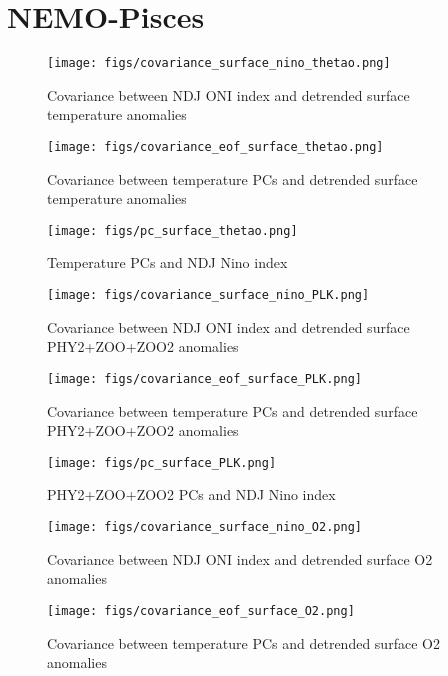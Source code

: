 
\section{NEMO-Pisces}

\newpage

\begin{figure}[h!]
\centering
    \texttt{[image: figs/covariance\_surface\_nino\_thetao.png]}
    \caption{Covariance between NDJ ONI index and detrended surface temperature anomalies}
\end{figure}

\begin{figure}[h!]
\centering
    \texttt{[image: figs/covariance\_eof\_surface\_thetao.png]}
    \caption{Covariance between temperature PCs and detrended surface temperature anomalies}
\end{figure}

\begin{figure}[h!]
\centering
    \texttt{[image: figs/pc\_surface\_thetao.png]}
    \caption{Temperature PCs and NDJ Nino index}
\end{figure}

\begin{figure}[h!]
\centering
    \texttt{[image: figs/covariance\_surface\_nino\_PLK.png]}
    \caption{Covariance between NDJ ONI index and detrended surface PHY2+ZOO+ZOO2 anomalies}
\end{figure}

\begin{figure}[h!]
\centering
    \texttt{[image: figs/covariance\_eof\_surface\_PLK.png]}
    \caption{Covariance between temperature PCs and detrended surface PHY2+ZOO+ZOO2 anomalies}
\end{figure}

\begin{figure}[h!]
\centering
    \texttt{[image: figs/pc\_surface\_PLK.png]}
    \caption{PHY2+ZOO+ZOO2 PCs and NDJ Nino index}
\end{figure}

\begin{figure}[h!]
\centering
    \texttt{[image: figs/covariance\_surface\_nino\_O2.png]}
    \caption{Covariance between NDJ ONI index and detrended surface O2 anomalies}
\end{figure}

\begin{figure}[h!]
\centering
    \texttt{[image: figs/covariance\_eof\_surface\_O2.png]}
    \caption{Covariance between temperature PCs and detrended surface O2 anomalies}
\end{figure}


